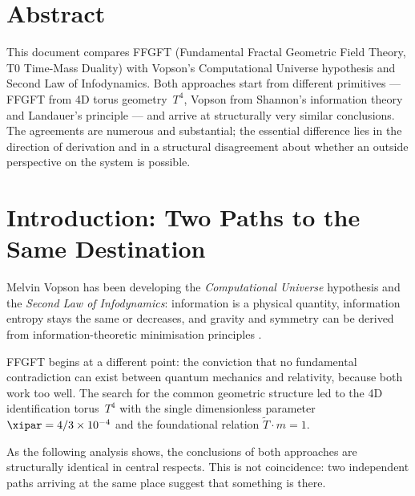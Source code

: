 
\section*{Abstract}

This document compares FFGFT (Fundamental Fractal Geometric Field Theory,
T0 Time-Mass Duality) with Vopson's Computational Universe hypothesis and
Second Law of Infodynamics. Both approaches start from different primitives ---
FFGFT from 4D torus geometry~$T^4$, Vopson from Shannon's information theory
and Landauer's principle --- and arrive at structurally very similar conclusions.
The agreements are numerous and substantial; the essential difference lies in
the direction of derivation and in a structural disagreement about whether an
outside perspective on the system is possible.

\tableofcontents
\newpage

\section{Introduction: Two Paths to the Same Destination}

Melvin Vopson has been developing the \emph{Computational Universe} hypothesis
and the \emph{Second Law of Infodynamics}: information is a physical quantity,
information entropy stays the same or decreases, and gravity and symmetry can
be derived from information-theoretic minimisation principles
\cite{Vopson2022,Vopson2023,Vopson2024}.

FFGFT begins at a different point: the conviction that no fundamental
contradiction can exist between quantum mechanics and relativity, because both
work too well. The search for the common geometric structure led to the 4D
identification torus~$T^4$ with the single dimensionless parameter
$\xipar = 4/3 \times 10^{-4}$ and the foundational relation $\tilde{T} \cdot m = 1$.

As the following analysis shows, the conclusions of both approaches are
structurally identical in central respects. This is not coincidence: two
independent paths arriving at the same place suggest that something is there.

